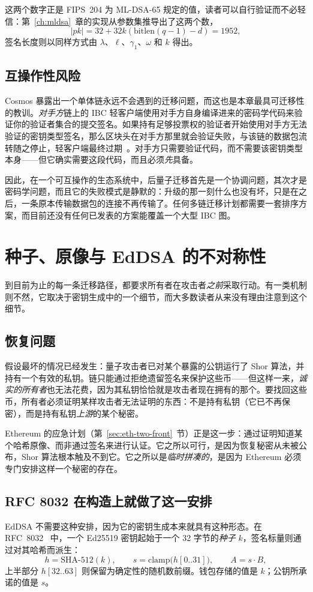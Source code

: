 这两个数字正是 FIPS~204 为 ML-DSA-65 规定的值，读者可以自行验证而不必轻信：第~\ref{ch:mldsa}~章的实现从参数集推导出了这两个数，
\[
|pk| = 32 + 32k(\mathrm{bitlen}(q-1) - d) = 1952,
\]
签名长度则以同样方式由 $\lambda$、$\ell$、$\gamma_1$、$\omega$ 和 $k$ 得出。

\subsection{互操作性风险}
Cosmos 暴露出一个单体链永远不会遇到的迁移问题，而这也是本章最具可迁移性的教训。\emph{对手方}链上的 IBC 轻客户端使用对手方自身编译进来的密码学代码来验证你的验证者集合的提交签名。如果持有足够投票权的验证者开始使用对手方无法验证的密钥类型签名，那么区块头在对手方那里就会验证失败，与该链的数据包流转随之停止，轻客户端最终过期~\cite{cosmossdkpq}。对手方只需要验证代码，而不需要该密钥类型本身——但它确实需要这段代码，而且必须\emph{先}具备。

因此，在一个可互操作的生态系统中，后量子迁移首先是一个协调问题，其次才是密码学问题，而且它的失败模式是静默的：升级的那一刻什么也没有坏，只是在之后，一条原本传输数据包的连接不再传输了。任何多链迁移计划都需要一套排序方案，而目前还没有任何已发表的方案能覆盖一个大型 IBC 图。


\section{种子、原像与 EdDSA 的不对称性}
\label{sec:eddsa-asymmetry}

到目前为止的每一条迁移路径，都要求所有者在攻击者\emph{之前}采取行动。有一类机制则不然，它取决于密钥生成中的一个细节，而大多数读者从来没有理由注意到这个细节。

\subsection{恢复问题}
假设最坏的情况已经发生：量子攻击者已对某个暴露的公钥运行了 Shor 算法，并持有一个有效的私钥。链只能通过拒绝遗留签名来保护这些币——但这样一来，\emph{诚实的所有者}也无法花费，因为其私钥恰恰就是攻击者现在拥有的那个。要找回这些币，所有者必须证明某样攻击者无法证明的东西：不是持有私钥（它已不再保密），而是持有私钥\emph{上游}的某个秘密。

Ethereum 的应急计划（第~\ref{sec:eth-two-front}~节）正是这一步：通过证明知道某个哈希原像、而非通过签名来进行认证。它之所以可行，是因为恢复秘密从未被公布，Shor 算法根本触及不到它。它之所以是\emph{临时拼凑的}，是因为 Ethereum 必须专门安排这样一个秘密的存在。

\subsection{RFC 8032 在构造上就做了这一安排}
EdDSA 不需要这种安排，因为它的密钥生成本来就具有这种形态。在 RFC~8032~\cite{rfc8032} 中，一个 Ed25519 密钥起始于一个 32 字节的\emph{种子} $k$，签名标量则通过对其哈希而派生：
\[
  h = \mathrm{SHA\text{-}512}(k), \qquad
  s = \mathrm{clamp}\big(h[0..31]\big), \qquad
  A = s\cdot B ,
\]
上半部分 $h[32..63]$ 则保留为确定性的随机数前缀。钱包存储的值是 $k$；公钥所承诺的值是 $s$。

